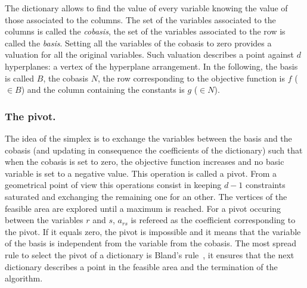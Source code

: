 The dictionary allows to find the value of every variable knowing the value of those associated to the columns. The set of the variables associated to the columns is called the \emph{cobasis}, the set of the variables associated to the row is called the \emph{basis}. Setting all the variables of the cobasis to zero provides a valuation for all the original variables. Such valuation describes a point against $d$ hyperplanes: a vertex of the hyperplane arrangement.%
In the following, the basis is called $B$, the cobasis $N$, the row corresponding to the objective function is $f$ ($\in B$) and the column containing the constants is $g$ ($\in N$).  

\subsubsection{The pivot.} 
The idea of the simplex is to exchange the variables between the basis and the cobasis (and updating in consequence the coefficients of the dictionary) such that when the cobasis is set to zero, the objective function increases and no basic variable is set to a negative value. This operation is called a pivot. From a geometrical point of view this operations consist in keeping $d-1$ constraints saturated and exchanging the remaining one for an other.%
The vertices of the feasible area are explored until a maximum is reached. For a pivot occuring between the variables $r$ and $s$, $a_{rs}$ is refereed as the coefficient corresponding to the pivot. If it equals zero, the pivot is impossible and it means that the variable of the basis is independent from the variable from the cobasis. The most spread rule to select the pivot of a dictionary is Bland's rule~\cite{bland}, it ensures that the next dictionary describes a point in the feasible area and the termination of the algorithm.



